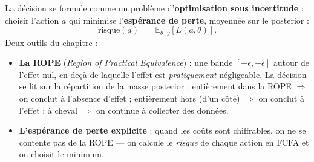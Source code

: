 \documentclass[11pt,a4paper]{article}
\newcommand{\given}{\,\vert\,}
\begin{document}
\begin{rappel}
La décision se formule comme un problème d'\textbf{optimisation sous
incertitude} : choisir l'action $a$ qui minimise l'\textbf{espérance de
perte}, moyennée sur le posterior :
\[
\text{risque}(a) \;=\; \mathbb{E}_{\theta \given y}\!\left[L(a, \theta)\right].
\]
Deux outils du chapitre :
\begin{itemize}[leftmargin=4mm, itemsep=0.5mm]
  \item \textbf{La ROPE} (\emph{Region of Practical Equivalence}) : une bande
        $[-\epsilon, +\epsilon]$ autour de l'effet nul, en deçà de laquelle
        l'effet est \emph{pratiquement} négligeable. La décision se lit sur
        la répartition de la masse posterior : entièrement dans la ROPE
        $\Rightarrow$ on conclut à l'absence d'effet ; entièrement hors
        (d'un côté) $\Rightarrow$ on conclut à l'effet ; à cheval
        $\Rightarrow$ on continue à collecter des données.
  \item \textbf{L'espérance de perte explicite} : quand les coûts sont
        chiffrables, on ne se contente pas de la ROPE --- on calcule le
        \emph{risque} de chaque action en FCFA et on choisit le minimum.
\end{itemize}
\end{rappel}
\end{document}
